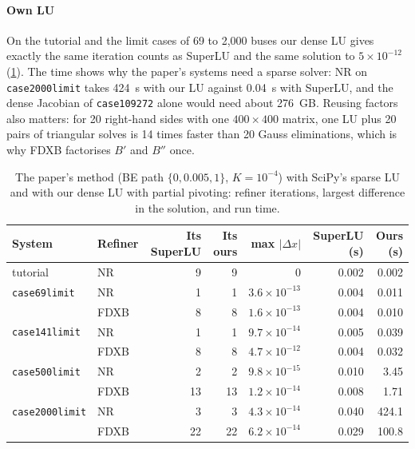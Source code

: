 \documentclass[sigconf,nonacm]{acmart}
\newcommand{\thead}[1]{\textbf{#1}}
\newcommand{\code}[1]{\texttt{#1}}
\begin{document}
\paragraph{Own LU} On the tutorial and the limit cases of 69 to 2{,}000 buses our dense LU gives exactly the
same iteration counts as SuperLU and the same solution to $5\times10^{-12}$ (\cref{tab:ownlu}). The time shows
why the paper's systems need a sparse solver: NR on \code{case2000limit} takes \SI{424}{s} with our LU against
\SI{0.04}{s} with SuperLU, and the dense Jacobian of \code{case109272} alone would need about \SI{276}{GB}.
Reusing factors also matters: for 20 right-hand sides with one $400\times400$ matrix, one LU plus 20 pairs of
triangular solves is 14 times faster than 20 Gauss eliminations, which is why FDXB factorises $B'$ and $B''$
once.

\begin{table}[t]
\centering
\caption{The paper's method (BE path $\{0,0.005,1\}$, $K=10^{-4}$) with SciPy's sparse LU and with our dense
LU with partial pivoting: refiner iterations, largest difference in the solution, and run time.}
\label{tab:ownlu}
\small
\setlength{\tabcolsep}{7pt}
\begin{tabular}{@{}l l r r r r r@{}}
\toprule
\thead{System} & \thead{Refiner} & \thead{Its SuperLU} & \thead{Its ours} & \thead{max $|\Delta x|$} & \thead{SuperLU (s)} & \thead{Ours (s)} \\
\midrule
tutorial  & NR   & 9  & 9  & 0             & 0.002 & 0.002 \\
\code{case69limit}   & NR   & 1  & 1  & $3.6\times10^{-13}$ & 0.004 & 0.011 \\
                     & FDXB & 8  & 8  & $1.6\times10^{-13}$ & 0.004 & 0.010 \\
\code{case141limit}  & NR   & 1  & 1  & $9.7\times10^{-14}$ & 0.005 & 0.039 \\
                     & FDXB & 8  & 8  & $4.7\times10^{-12}$ & 0.004 & 0.032 \\
\code{case500limit}  & NR   & 2  & 2  & $9.8\times10^{-15}$ & 0.010 & 3.45 \\
                     & FDXB & 13 & 13 & $1.2\times10^{-14}$ & 0.008 & 1.71 \\
\code{case2000limit} & NR   & 3  & 3  & $4.3\times10^{-14}$ & 0.040 & 424.1 \\
                     & FDXB & 22 & 22 & $6.2\times10^{-14}$ & 0.029 & 100.8 \\
\bottomrule
\end{tabular}
\end{table}
\end{document}
